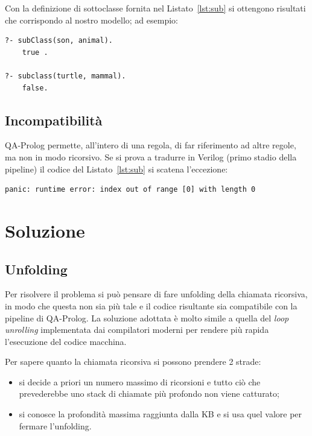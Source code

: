 \documentclass[]{article}
\begin{document}
Con la definizione di sottoclasse fornita nel Listato~\ref{lst:sub} si ottengono risultati che corrispondo al nostro modello; ad esempio:
\begin{listing}[h]
	\centering
	\begin{minipage}{.5\linewidth}
		\begin{verbatim}
?- subClass(son, animal).
    true .

?- subclass(turtle, mammal).
    false.
		\end{verbatim}
	\end{minipage}
	\caption{Query examples}
	\label{lst:query}
\end{listing}

\subsection{Incompatibilità}
QA-Prolog permette, all'intero di una regola, di far riferimento ad altre regole, ma non in modo ricorsivo. Se si prova a tradurre in Verilog (primo stadio della pipeline) il codice del Listato~\ref{lst:sub} si scatena l'eccezione:
\begin{listing}[h]
	\centering
	\begin{minipage}{.72\linewidth}
		\begin{verbatim}
panic: runtime error: index out of range [0] with length 0
		\end{verbatim}
	\end{minipage}
	\caption{Error}
\end{listing}

\section{Soluzione}
\subsection{Unfolding}
Per risolvere il problema si può pensare di fare unfolding della chiamata ricorsiva, in modo che questa non sia più tale e il codice risultante sia compatibile con la pipeline di QA-Prolog.  La soluzione adottata è molto simile a quella del \emph{loop unrolling} implementata dai compilatori moderni per rendere più rapida l'esecuzione del codice macchina.

Per sapere quanto  la chiamata ricorsiva si possono prendere 2 strade:
\begin{itemize}
	\item si decide a priori un numero massimo di ricorsioni e tutto ciò che prevederebbe uno stack di chiamate più profondo non viene catturato;
	\item si conosce la profondità massima raggiunta dalla KB e si usa quel valore per fermare l'unfolding. 
\end{itemize}
\end{document}
